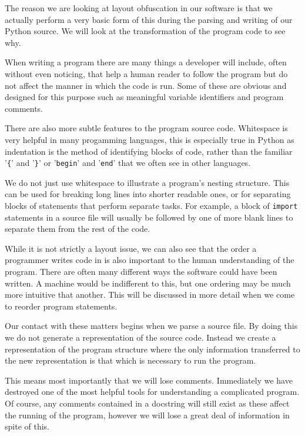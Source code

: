 \documentclass[twoside,a4paper]{report}
\begin{document}
The reason we are looking at layout obfuscation in our software is that we actually perform a very basic
form of this during the parsing and writing of our Python source. We will look at the transformation of the
program code to see why.

When writing a program there are many things a developer will include, often without even noticing, that
help a human reader to follow the program but do not affect the manner in which the code is run. Some of
these are obvious and designed for this purpose such as meaningful variable identifiers and program comments.

There are also more subtle features to the program source code. Whitespace is very helpful in many progamming
languages, this is especially true in Python as indentation is the method of identifying blocks of code, rather than
the familiar '\texttt{\{}' and '\texttt{\}}' or '\texttt{begin}' and '\texttt{end}' that we often see in other
languages. 

We do not just use whitespace to illustrate a program's nesting structure. This can be used for breaking long lines
into shorter readable ones, or for separating blocks of statements that perform separate tasks. For example, a block
of \texttt{import} statements in a source file will usually be followed by one of more blank lines to separate them
from the rest of the code.

While it is not strictly a layout issue, we can also see that the order a programmer writes code in is also important
to the human understanding of the program. There are often many different ways the software could have been written.
A machine would be indifferent to this, but one ordering may be much more intuitive that another. This will be discussed
in more detail when we come to reorder program statements.

Our contact with these matters begins when we parse a source file. By doing this we do not generate a representation of
the source code. Instead we create a representation of the program structure where the only information transferred to the
new representation is that which is necessary to run the program.

This means most importantly that we will lose comments. Immediately we have destroyed one of the most helpful tools
for understanding a complicated program. Of course, any comments contained in a docstring will still exist as these
affect the running of the program, however we will lose a great deal of information in spite of this.
\end{document}
